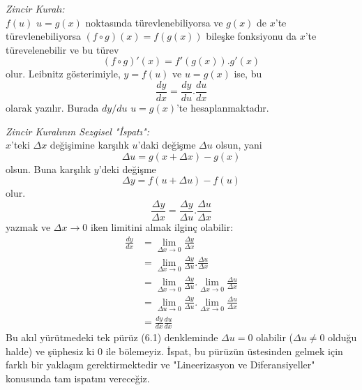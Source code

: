\begin{teorem} \textit{Zincir Kuralı:}\\
$f(u)$ $u=g(x)$ noktasında türevlenebiliyorsa ve $g(x)$ de $x$'te türevlenebiliyorsa $(f \circ g)(x)=f(g(x))$ bileşke fonksiyonu da $x$'te türevelenebilir ve bu türev
	\begin{equation*}
	(f \circ g)'(x)=f'(g(x)).g'(x)
	\end{equation*}
olur. Leibnitz gösterimiyle, $y=f(u)$ ve $u=g(x)$ ise, bu
	\begin{equation*}
	\frac{dy}{dx}=\frac{dy}{du}.\frac{du}{dx}
	\end{equation*}
olarak yazılır. Burada $dy/du$ $u=g(x)$'te hesaplanmaktadır.
\end{teorem}
\begin{ispat}
	\textit{Zincir Kuralının Sezgisel "İspatı":}\\
$x$'teki $\varDelta x$ değişimine karşılık $u$'daki değişme $\varDelta u$ olsun, yani
	\begin{equation*}
	\varDelta u=g(x+\varDelta x)-g(x)
	\end{equation*}
olsun. Buna karşılık $y$'deki değişme
	\begin{equation*}
	\varDelta y=f(u+\varDelta u)-f(u)
	\end{equation*}
olur.
	\begin{equation}
	\frac{\varDelta y}{\varDelta x} = \frac{\varDelta y}{\varDelta u}.\frac{\varDelta u}{\varDelta x}
	\end{equation}
yazmak ve $\varDelta x \rightarrow 0$ iken limitini almak ilginç olabilir:
	\begin{equation*}
	\begin{split}
	\frac{dy}{dx}&=\lim_{\varDelta x \rightarrow 0}\frac{\varDelta y}{\varDelta x}\\
		&=\lim_{\varDelta x \rightarrow 0}\frac{\varDelta y}{\varDelta u}.\frac{\varDelta u}{\varDelta x}\\
		&=\lim_{\varDelta x \rightarrow 0}\frac{\varDelta y}{\varDelta u}.\lim_{\varDelta x \rightarrow 0}\frac{\varDelta u}{\varDelta x}\\
		&=\lim_{\varDelta u \rightarrow 0}\frac{\varDelta y}{\varDelta u}.\lim_{\varDelta x \rightarrow 0}\frac{\varDelta u}{\varDelta x}\\
		&=\frac{dy}{dx}\frac{du}{dx}
	\end{split}
	\end{equation*}
Bu akıl yürütmedeki tek pürüz (6.1) denkleminde $\varDelta u = 0$ olabilir ($\varDelta u $$\ne$$ 0$ olduğu halde) ve şüphesiz ki 0 ile bölemeyiz. İspat, bu pürüzün üstesinden gelmek için farklı bir yaklaşım gerektirmektedir ve "Lineerizasyon ve Diferansiyeller" konusunda tam ispatını vereceğiz.
\end{ispat}

